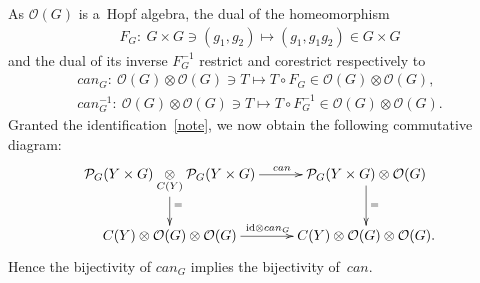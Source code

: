 \documentclass[11pt]{article}
\begin{document}
As ${\mathcal O}(G)$ is a~Hopf algebra, the dual of the homeomorphism
\begin{gather*}
F_G\colon \  G\times G\ni (g_1,g_2)\longmapsto (g_1,g_1g_2)\in G\times G
\end{gather*}
and the dual of its inverse $F_G^{-1}$ restrict and corestrict respectively to
\begin{gather*}
{can}_G\colon \ {\mathcal O}(G)\otimes{\mathcal O}(G)\ni T \longmapsto T\circ F_G\in {\mathcal O}(G)\otimes{\mathcal O}(G),
\\
{can}_G^{-1}\colon \  {\mathcal O}(G)\otimes{\mathcal O}(G)\ni T \longmapsto T\circ F_G^{-1}\in {\mathcal
O}(G)\otimes{\mathcal O}(G).
\end{gather*}
Granted the identif\/ication~\eqref{note}, we now obtain the following commutative diagram:
\begin{gather*}
\xymatrix{
\mathcal{P}_{G}(Y\times G)\underset{C(Y)}{\otimes}\mathcal{P}_{G}(Y\times G) \ar[r]^{\qquad {can}}\ar[d]^{=}&
\mathcal{P}_{G}(Y\times G)\otimes{\mathcal O}(G)\ar[d]^{=}\\
C(Y)\otimes{\mathcal O}(G)\otimes{\mathcal O}(G)\ar[r]^{\mathrm{id} \otimes {can}_G}& C(Y)\otimes{\mathcal O}(G)\otimes{\mathcal O}(G).
}
\end{gather*}
Hence the bijectivity of ${can}_G$ implies the bijectivity of~${can}$.
\end{document}
